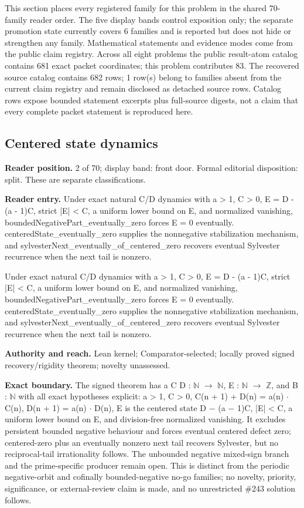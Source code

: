 \documentclass[11pt]{article}
\begin{document}
This section places every registered family for this problem in the shared 70-family reader order.  The five display bands control exposition only; the separate promotion state currently covers 6 families and is reported but does not hide or strengthen any family.  Mathematical statements and evidence modes come from the public claim registry.  Across all eight problems the public result-atom catalog contains 681 exact packet coordinates; this problem contributes 83.  The recovered source catalog contains 682 rows; 1 row(s) belong to families absent from the current claim registry and remain disclosed as detached source rows.  Catalog rows expose bounded statement excerpts plus full-source digests, not a claim that every complete packet statement is reproduced here.

\subsection{Centered state dynamics}
\textbf{Reader position.} 2 of 70; display band: front door.  Formal editorial disposition: split.  These are separate classifications.

\textbf{Reader entry.} Under exact natural C/D dynamics with a > 1, C > 0, E = D - (a - 1)C, strict |E| < C, a uniform lower bound on E, and normalized vanishing, boundedNegativePart\_eventually\_zero forces E = 0 eventually. centeredState\_eventually\_zero supplies the nonnegative stabilization mechanism, and sylvesterNext\_eventually\_of\_centered\_zero recovers eventual Sylvester recurrence when the next tail is nonzero.

Under exact natural C/D dynamics with a > 1, C > 0, E = D - (a - 1)C, strict |E| < C, a uniform lower bound on E, and normalized vanishing, boundedNegativePart\_eventually\_zero forces E = 0 eventually. centeredState\_eventually\_zero supplies the nonnegative stabilization mechanism, and sylvesterNext\_eventually\_of\_centered\_zero recovers eventual Sylvester recurrence when the next tail is nonzero.

\textbf{Authority and reach.} Lean kernel; Comparator-selected; locally proved signed recovery/rigidity theorem; novelty unassessed.

\textbf{Exact boundary.} The signed theorem has a C D : \ensuremath{\mathbb{N}} \ensuremath{\to} \ensuremath{\mathbb{N}}, E : \ensuremath{\mathbb{N}} \ensuremath{\to} \ensuremath{\mathbb{Z}}, and B : \ensuremath{\mathbb{N}} with all exact hypotheses explicit: a > 1, C > 0, C(n + 1) + D(n) = a(n) \ensuremath{\mathbin{\cdot}} C(n), D(n + 1) = a(n) \ensuremath{\mathbin{\cdot}} D(n), E is the centered state D \ensuremath{-} (a \ensuremath{-} 1)C, |E| < C, a uniform lower bound on E, and division-free normalized vanishing. It excludes persistent bounded negative behaviour and forces eventual centered defect zero; centered-zero plus an eventually nonzero next tail recovers Sylvester, but no reciprocal-tail irrationality follows. The unbounded negative mixed-sign branch and the prime-specific producer remain open. This is distinct from the periodic negative-orbit and cofinally bounded-negative no-go families; no novelty, priority, significance, or external-review claim is made, and no unrestricted \#243 solution follows.
\end{document}
